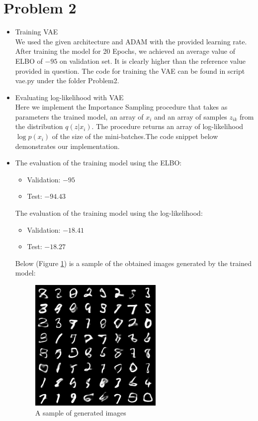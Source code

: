 \section*{Problem 2}
\begin{itemize}
     \item[A.]{Training VAE}\\
     We used the given architecture and ADAM with the provided learning rate. After training the model for 20 Epochs, we achieved an average value of ELBO of $-95$ on validation set. It is clearly higher than the reference value provided in question. The code for training the VAE  can be found in script vae.py under the folder Problem2.
     
     \item[B.1]{Evaluating log-likelihood with VAE}\\
     Here we implement the Importance Sampling procedure that takes as parameters the trained model, an array of $x_i$ and an array of samples $z_{ik}$ from the distribution $q(z|x_i)$. The procedure returns an array of log-likelihood $\log p(x_i)$  of the size of the mini-batches.The code snippet below demonstrates our implementation. 
     
     
     
     \item[B.2]
     The evaluation of the training model using the ELBO:
     \begin{itemize}
         \item [a.] Validation: $-95$
         \item [b.] Test: $-94.43$
     \end{itemize}
     The evaluation of the training model using the log-likelihood:
     \begin{itemize}
         \item [a.] Validation: $-18.41$
         \item [b.] Test: $-18.27$
     \end{itemize}
     Below (Figure \ref{fig:gen_sample}) is a sample of the obtained images generated by the trained model:
\begin{figure}
\centering
  \includegraphics[scale=1]{sample_19.png}
  \caption{A sample of generated images}
  \label{fig:gen_sample}
\end{figure}
\end{itemize}
